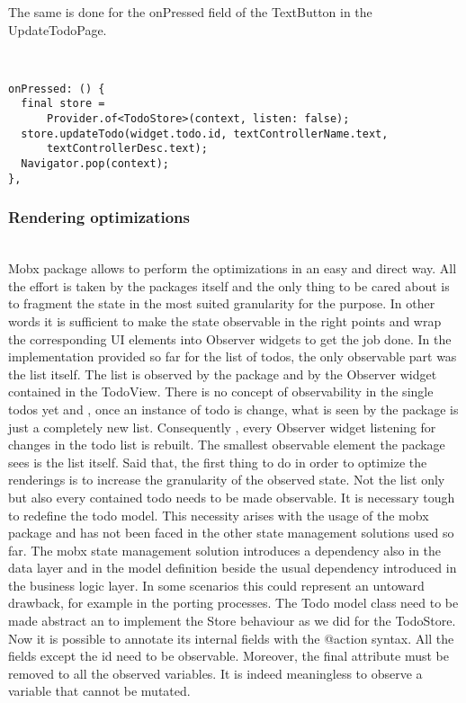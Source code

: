 The same is done for the onPressed field of the TextButton in the UpdateTodoPage.
\begin{code}
\mbox{}\\
 \mbox{}
		\label{code:2.14}
\begin{verbatim}
onPressed: () {
  final store =
      Provider.of<TodoStore>(context, listen: false);
  store.updateTodo(widget.todo.id, textControllerName.text,
      textControllerDesc.text);
  Navigator.pop(context);
},
\end{verbatim}
\mbox{}
\end{code}

\subsubsection{Rendering optimizations} \mbox{}\\ \label{par:todo_app_inherited_widget_introduction}
Mobx package allows to perform the optimizations in an easy and direct way. All the effort is taken by the packages itself and the only thing to be cared about is to fragment the state in the most suited granularity for the purpose. In other words it is sufficient to make the state observable in the right points and wrap the corresponding UI elements into Observer widgets to get the job done. In the implementation provided so far for the list of todos, the only observable part was the list itself. The list is observed by the package and by the Observer widget contained in the TodoView. There is no concept of observability in the single todos yet and , once an instance of todo is change, what is seen by the package is just a completely new list. Consequently , every Observer widget listening for changes in the todo list is rebuilt. The smallest observable element the package sees is the list itself. Said that, the first thing to do in order to optimize the renderings is to increase the granularity of the observed state. Not the list only but also every contained todo needs to be made observable. It is necessary tough to redefine the todo model. This necessity arises with the usage of the mobx package and has not been faced in the other state management solutions used so far. The mobx state management solution introduces a dependency also in the data layer and in the model definition beside the usual dependency introduced in the business logic layer. In some scenarios this could represent an untoward drawback, for example in the porting processes. The Todo model class need to be made abstract an to implement the Store behaviour as we did for the TodoStore. Now it is possible to annotate its internal fields with the @action syntax. All the fields except the id need to be observable. Moreover, the final attribute must be removed to all the observed variables. It is indeed meaningless to observe a variable that cannot be mutated.
